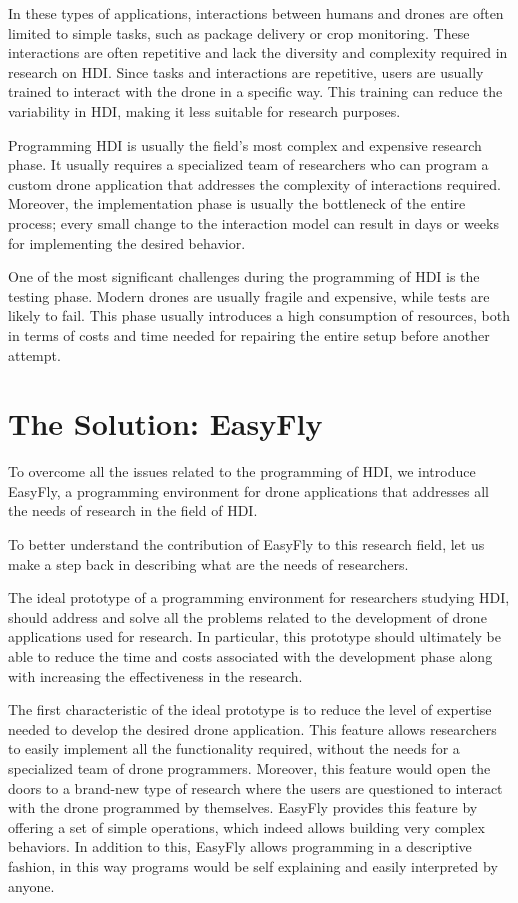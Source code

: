 In these types of applications, interactions between humans and drones are often limited to simple tasks, such as package
delivery or crop monitoring. These interactions are often repetitive and lack the diversity and complexity required in
research on HDI. Since tasks and interactions are repetitive, users are usually trained to interact with the drone
in a specific way. This training can reduce the variability in HDI, making it less suitable for research purposes.

Programming HDI is usually the field's most complex and expensive research phase. It usually requires
a specialized team of researchers who can program a custom drone application that addresses the complexity of interactions
required. Moreover, the implementation phase is usually the bottleneck of the entire process; every small change to
the interaction model can result in days or weeks for implementing the desired behavior.

One of the most significant challenges during the programming of HDI is the testing phase. Modern drones are
usually fragile and expensive, while tests are likely to fail. This phase usually introduces a high consumption of resources, 
both in terms of costs and time needed for repairing the entire setup before another attempt.


\section{The Solution: EasyFly}\label{sec:the_solution}
To overcome all the issues related to the programming of HDI, we introduce EasyFly, a programming environment for
drone applications that addresses all the needs of research in the field of HDI.

To better understand the contribution of EasyFly to this research field, let us make a step back in describing
what are the needs of researchers.

The ideal prototype of a programming environment for researchers studying HDI, should address and solve all the problems
related to the development of drone applications used for research. In particular, this prototype should ultimately be able
to reduce the time and costs associated with the development phase along with increasing the effectiveness in the research.

The first characteristic of the ideal prototype is to reduce the level of expertise needed to develop the desired drone
application. This feature allows researchers to easily implement all the functionality required, without the needs for
a specialized team of drone programmers. Moreover, this feature would open the doors to a brand-new type of research where
the users are questioned to interact with the drone programmed by themselves.
EasyFly provides this feature by offering a set of simple operations, which indeed allows building very complex behaviors.
In addition to this, EasyFly allows programming in a descriptive fashion, in this way programs would be self explaining
and easily interpreted by anyone.

